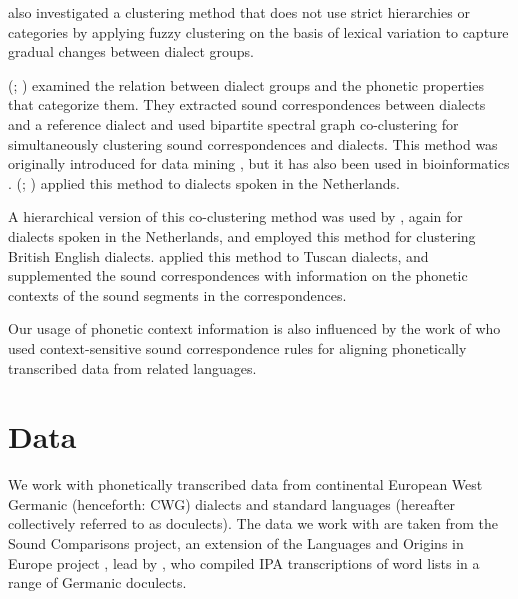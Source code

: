 \documentclass[a4paper]{article}
\begin{document}
\citet{proell2013detecting} also investigated a clustering method
that does not use strict hierarchies or categories by
applying fuzzy clustering on the basis of lexical variation
to capture gradual changes between dialect groups.

\citeauthor{wieling2011bipartite} (\citeyear{wieling2009bipartite}; \citeyear{wieling2011bipartite})
examined the relation between dialect groups and
the phonetic properties that categorize them.
They extracted sound correspondences between dialects
and a reference dialect
and used bipartite spectral graph co-clustering
for simultaneously clustering sound correspondences and dialects.
This method was originally introduced for data mining
\citep{dhillon2001co-clustering, zha2001bipartite},
but it has also been used in bioinformatics \citep{kluger2003spectral}.
\citeauthor{wieling2011bipartite}
(\citeyear{wieling2009bipartite}; \citeyear{wieling2011bipartite})
applied this method to dialects spoken in the Netherlands.

A hierarchical version of this co-clustering method
was used by \citet{wieling2010hierarchical},
again for dialects spoken in the Netherlands,
and \citet{wieling2013analyzing} employed this method for
clustering British English dialects.
\citet{montemagni2013synchronic} applied this method to Tuscan dialects,
and supplemented the sound correspondences with information
on the phonetic contexts of the sound segments in the correspondences.

Our usage of phonetic context information is also
influenced by the work of \citet{wettig2012using}
who used context-sensitive sound correspondence rules
for aligning phonetically transcribed data from related languages.

\section{Data}
\label{sec:data}

We work with phonetically transcribed data from
continental European West Germanic (henceforth: CWG)
dialects and standard languages
(hereafter collectively referred to as doculects).
The data we work with are taken from the Sound Comparisons project,
an extension of the Languages and Origins in Europe project \citep{renfrew2009languages},
lead by \citet{heggarty2018sound},
who compiled IPA transcriptions of word lists
in a range of Germanic doculects.
\end{document}
